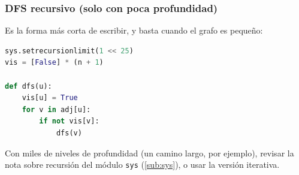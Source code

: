 \vspace{0.3cm}
\subsubsection{DFS recursivo (solo con poca profundidad)}

Es la forma más corta de escribir, y basta cuando el grafo es pequeño:

\begin{lstlisting}[language=Python]
sys.setrecursionlimit(1 << 25)
vis = [False] * (n + 1)

def dfs(u):
    vis[u] = True
    for v in adj[u]:
        if not vis[v]:
            dfs(v)
\end{lstlisting}

Con miles de niveles de profundidad (un camino largo, por ejemplo), revisar la nota
sobre recursión del módulo \texttt{sys} (\ref{sub:sys}), o usar la versión
iterativa.
